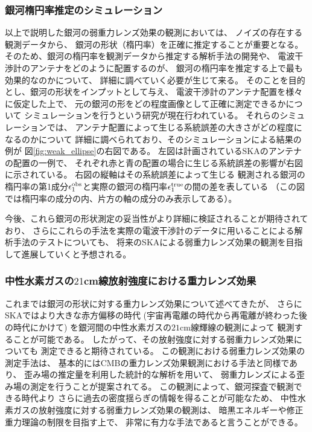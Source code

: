 \subsubsection{銀河楕円率推定のシミュレーション}
%
以上で説明した銀河の弱重力レンズ効果の観測においては、
ノイズの存在する観測データから、
銀河の形状（楕円率）を正確に推定することが重要となる。
%
そのため、銀河の楕円率を観測データから推定する解析手法の開発や、
電波干渉計のアンテナをどのように配置するのが、
銀河の楕円率を推定する上で最も効果的なのかについて、
詳細に調べていく必要が生じて来る。
%
そのことを目的とし、銀河の形状をインプットとして与え、
電波干渉計のアンテナ配置を様々に仮定した上で、
元の銀河の形をどの程度画像として正確に測定できるかについて
シミュレーションを行うという研究が現在行われている。
%
それらのシミュレーションでは、
アンテナ配置によって生じる系統誤差の大きさがどの程度になるのかについて
詳細に調べられており、そのシミュレーションによる結果の例が
図\ref{fig:weak_ellipse}の右図である。
% 
左図は計画されているSKAのアンテナの配置の一例で、
それぞれ赤と青の配置の場合に生じる系統誤差の影響が右図に示されている。
%
右図の縦軸はその系統誤差によって生じる
観測される銀河の楕円率の第1成分$\epsilon^{\rm obs}_{1}$と実際の銀河の楕円率$\epsilon^{\rm true}_{1}$の間の差を表している
（この図では楕円率の成分の内、片方の軸の成分のみ表示してある）。

今後、これら銀河の形状測定の妥当性がより詳細に検証されることが期待されており、
さらにこれらの手法を実際の電波干渉計のデータに用いることによる解析手法のテストについても、
将来のSKAによる弱重力レンズ効果の観測を目指して進展していくと予想される。




\subsubsection{中性水素ガスの$21$cm線放射強度における重力レンズ効果}

これまでは銀河の形状に対する重力レンズ効果について述べてきたが、
さらにSKAではより大きな赤方偏移の時代
(宇宙再電離の時代から再電離が終わった後の時代にかけて)
を銀河間の中性水素ガスの$21$cm線輝線の観測によって
観測することが可能である。
したがって、その放射強度に対する弱重力レンズ効果についても
測定できると期待されている。
%
この観測における弱重力レンズ効果の測定手法は、
基本的にはCMBの重力レンズ効果観測における手法と同様であり、
歪み場の推定量を利用した統計的な解析を用いて、
弱重力レンズによる歪み場の測定を行うことが提案されてる。
%
この観測によって、銀河探査で観測できる時代より
さらに過去の密度揺らぎの情報を得ることが可能なため、
中性水素ガスの放射強度に対する弱重力レンズ効果の観測は、
暗黒エネルギーや修正重力理論の制限を目指す上で、
非常に有力な手法であると言うことができる。

